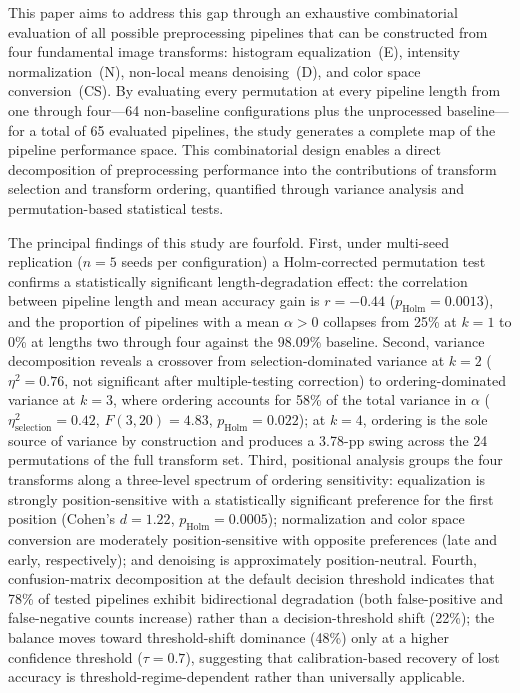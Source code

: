 \documentclass[preprint,5p,times,twocolumn]{elsarticle}
\begin{document}
This paper aims to address this gap through an exhaustive combinatorial evaluation of all possible preprocessing pipelines that can be constructed from four fundamental image transforms: histogram equalization~(E), intensity normalization~(N), non-local means denoising~(D), and color space conversion~(CS). By evaluating every permutation at every pipeline length from one through four---64 non-baseline configurations plus the unprocessed baseline---for a total of 65 evaluated pipelines, the study generates a complete map of the pipeline performance space. This combinatorial design enables a direct decomposition of preprocessing performance into the contributions of transform selection and transform ordering, quantified through variance analysis and permutation-based statistical tests.

The principal findings of this study are fourfold. First, under multi-seed replication ($n = 5$ seeds per configuration) a Holm-corrected permutation test confirms a statistically significant length-degradation effect: the correlation between pipeline length and mean accuracy gain is $r = -0.44$ ($p_{\mathrm{Holm}} = 0.0013$), and the proportion of pipelines with a mean $\alpha > 0$ collapses from 25\% at $k=1$ to 0\% at lengths two through four against the 98.09\% baseline. Second, variance decomposition reveals a crossover from selection-dominated variance at $k=2$ ($\eta^2 = 0.76$, not significant after multiple-testing correction) to ordering-dominated variance at $k=3$, where ordering accounts for 58\% of the total variance in $\alpha$ ($\eta^2_{\text{selection}} = 0.42$, $F(3,20) = 4.83$, $p_{\mathrm{Holm}} = 0.022$); at $k=4$, ordering is the sole source of variance by construction and produces a 3.78-pp swing across the 24 permutations of the full transform set. Third, positional analysis groups the four transforms along a three-level spectrum of ordering sensitivity: equalization is strongly position-sensitive with a statistically significant preference for the first position (Cohen's $d = 1.22$, $p_{\mathrm{Holm}} = 0.0005$); normalization and color space conversion are moderately position-sensitive with opposite preferences (late and early, respectively); and denoising is approximately position-neutral. Fourth, confusion-matrix decomposition at the default decision threshold indicates that 78\% of tested pipelines exhibit bidirectional degradation (both false-positive and false-negative counts increase) rather than a decision-threshold shift (22\%); the balance moves toward threshold-shift dominance (48\%) only at a higher confidence threshold ($\tau = 0.7$), suggesting that calibration-based recovery of lost accuracy is threshold-regime-dependent rather than universally applicable.
\end{document}
